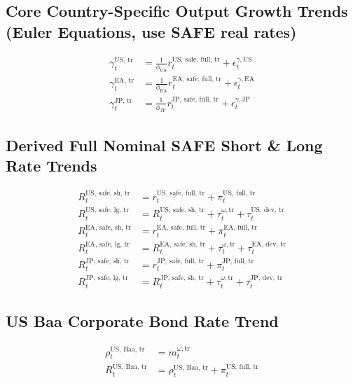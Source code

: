 \documentclass{article}
\begin{document}
\subsection*{Core Country-Specific Output Growth Trends (Euler Equations, use SAFE real rates)}
\begin{align}
    \gamma^{\text{US, tr}}_t &= \frac{1}{\phi_{\text{US}}} r^{\text{US, safe, full, tr}}_t + \epsilon^{\gamma, \text{US}}_t \\ %
    \gamma^{\text{EA, tr}}_t &= \frac{1}{\phi_{\text{EA}}} r^{\text{EA, safe, full, tr}}_t + \epsilon^{\gamma, \text{EA}}_t \\ %
    \gamma^{\text{JP, tr}}_t &= \frac{1}{\phi_{\text{JP}}} r^{\text{JP, safe, full, tr}}_t + \epsilon^{\gamma, \text{JP}}_t  %
\end{align}

\subsection*{Derived Full Nominal SAFE Short \& Long Rate Trends}
\begin{align}
    R^{\text{US, safe, sh, tr}}_t &= r^{\text{US, safe, full, tr}}_t + \pi^{\text{US, full, tr}}_t \\ %
    R^{\text{US, safe, lg, tr}}_t  &= R^{\text{US, safe, sh, tr}}_t + \tau^{\omega, \text{tr}}_t + \tau^{\text{US, dev, tr}}_t \\
    R^{\text{EA, safe, sh, tr}}_t &= r^{\text{EA, safe, full, tr}}_t + \pi^{\text{EA, full, tr}}_t \\ %
    R^{\text{EA, safe, lg, tr}}_t  &= R^{\text{EA, safe, sh, tr}}_t + \tau^{\omega, \text{tr}}_t + \tau^{\text{EA, dev, tr}}_t \\
    R^{\text{JP, safe, sh, tr}}_t &= r^{\text{JP, safe, full, tr}}_t + \pi^{\text{JP, full, tr}}_t \\ %
    R^{\text{JP, safe, lg, tr}}_t  &= R^{\text{JP, safe, sh, tr}}_t + \tau^{\omega, \text{tr}}_t + \tau^{\text{JP, dev, tr}}_t
\end{align}

\subsection*{US Baa Corporate Bond Rate Trend}
\begin{align}
    \rho^{\text{US, Baa, tr}}_t &= m^{\omega, \text{tr}}_t \\ %
    R^{\text{US, Baa, tr}}_t &= \rho^{\text{US, Baa, tr}}_t + \pi^{\text{US, full, tr}}_t
\end{align}
\end{document}
